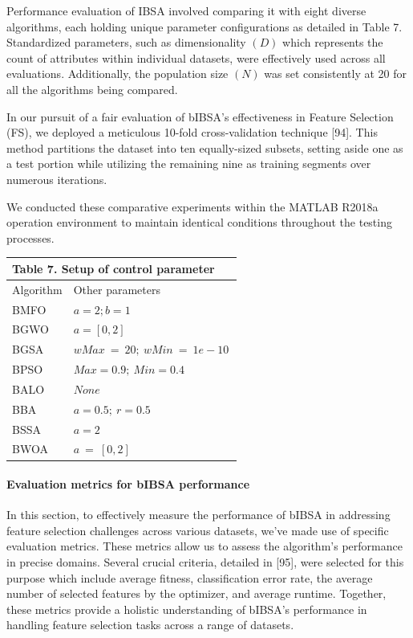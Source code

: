\documentclass{article} %
\begin{document}
Performance evaluation of IBSA involved comparing it with eight diverse algorithms, each holding unique parameter configurations as detailed in Table 7. Standardized parameters, such as dimensionality $(D)$ which represents the count of attributes within individual datasets, were effectively used across all evaluations. Additionally, the population size $(N)$ was set consistently at 20 for all the algorithms being compared.

In our pursuit of a fair evaluation of bIBSA's effectiveness in Feature Selection (FS), we deployed a meticulous 10-fold cross-validation technique [94]. This method partitions the dataset into ten equally-sized subsets, setting aside one as a test portion while utilizing the remaining nine as training segments over numerous iterations.

We conducted these comparative experiments within the MATLAB R2018a operation environment to maintain identical conditions throughout the testing processes.

\begin{tabular}{|p{1.1in}|p{2.8in}|} \hline 
\multicolumn{2}{|p{1in}|}{\textbf{Table }7\textbf{.} Setup of control parameter} \\ \hline 
Algorithm & Other parameters \\ \hline 
BMFO & $a=2;b=1$\textit{} \\ \hline 
BGWO & $a=\left[0,2\right]$\textit{} \\ \hline 
BGSA & $wMax\ =\ 20;\ wMin\ =\ 1e-10\ $\textit{} \\ \hline 
BPSO & $Max=0.9;\ Min=0.4\ $\textit{} \\ \hline 
BALO & $None$\textit{} \\ \hline 
BBA & $a=0.5;\ r=0.5$\textit{} \\ \hline 
BSSA & $a=2$\textit{} \\ \hline 
BWOA & $a\ =\ \left[0,2\right]$ \\ \hline 
\end{tabular}


\paragraph{ Evaluation metrics for bIBSA performance}

In this section, to effectively measure the performance of bIBSA in addressing feature selection challenges across various datasets, we've made use of specific evaluation metrics. These metrics allow us to assess the algorithm's performance in precise domains. Several crucial criteria, detailed in [95], were selected for this purpose which include average fitness, classification error rate, the average number of selected features by the optimizer, and average runtime. Together, these metrics provide a holistic understanding of bIBSA's performance in handling feature selection tasks across a range of datasets.
\end{document}
